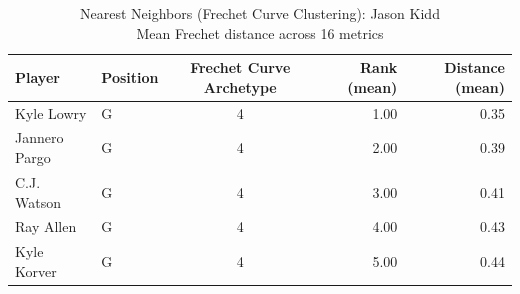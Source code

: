 \begin{table}[t]
\caption*{
{\fontsize{20}{25} Nearest Neighbors (Frechet Curve Clustering): Jason Kidd\fontsize{12}{15}\selectfont } \\ 
{\fontsize{14}{17}\selectfont  Mean Frechet distance across 16 metrics\fontsize{12}{15}\selectfont }
} 
\fontsize{12.0pt}{14.0pt}\selectfont
\begin{tabular*}{\linewidth}{@{\extracolsep{\fill}}llcrr}
\toprule
Player & Position & Frechet Curve Archetype & Rank (mean) & Distance (mean) \\ 
\midrule\addlinespace[2.5pt]
Kyle Lowry & G & 4 & 1.00 & 0.35 \\ 
Jannero Pargo & G & 4 & 2.00 & 0.39 \\ 
C.J. Watson & G & 4 & 3.00 & 0.41 \\ 
Ray Allen & G & 4 & 4.00 & 0.43 \\ 
Kyle Korver & G & 4 & 5.00 & 0.44 \\ 
\bottomrule
\end{tabular*}
\end{table}

